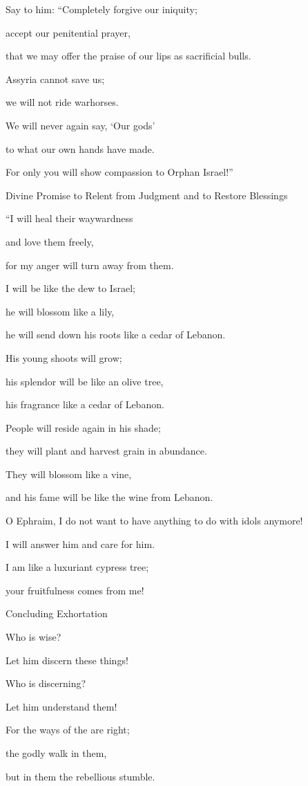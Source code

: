 {\par }{\Q Say
to him: “Completely
forgive
our iniquity;
\par }{\Q accept
our penitential
prayer,

\par }{\Q that we may offer the praise of our lips
as sacrificial bulls.
\par }{\Q {}Assyria
cannot
save
us;
\par }{\Q we will not
ride
warhorses.
\par }{\Q We will never
again
say,
‘Our gods’
\par }{\Q to what our own hands
have made.
\par }{\Q For
only you will show compassion
to Orphan Israel!”
\par }{\SH Divine Promise to Relent from Judgment and to Restore Blessings
\par }{\Q {}“I will heal
their waywardness
\par }{\Q and love
them freely,
\par }{\Q for
my anger
will turn
away from them.
\par }{\Q {}I will be
like the dew
to Israel;
\par }{\Q he will blossom
like a lily,
\par }{\Q he will send down
his roots
like a cedar of Lebanon.
\par }{\Q {}His young shoots
will grow;
\par }{\Q his splendor
will be like
an olive
tree,
\par }{\Q his fragrance
like a cedar of Lebanon.
\par }{\Q {}People
will reside
again
in
his shade;
\par }{\Q they will plant
and harvest grain
in abundance.

\par }{\Q They will blossom
like a vine,
\par }{\Q and his fame
will be like the wine
from Lebanon.
\par }{\Q {}O Ephraim,
I
do
not want
to have anything to do with idols
anymore!
\par }{\Q I
will answer
him and care
for him.
\par }{\Q I am
like
a luxuriant
cypress tree;

\par }{\Q your fruitfulness comes from me!
\par }{\SH Concluding Exhortation
\par }{\Q {}Who
is wise?
\par }{\Q Let him discern
these
things!
\par }{\Q Who is discerning?
\par }{\Q Let him understand
them!
\par }{\Q For
the ways
of the
{}
are right;
\par }{\Q the godly
walk
in them,
\par }{\PP but in them the rebellious
stumble.
\par }